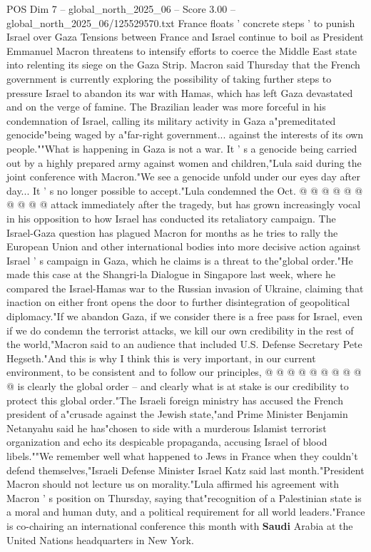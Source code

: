 \begin{textsample}{POS Dim 7 – global\_north\_2025\_06 – Score 3.00 – global\_north\_2025\_06/125529570.txt}  \label{ex:f7_pos_370}
France floats ' concrete steps ' to punish Israel over Gaza Tensions between France and Israel continue to boil as President Emmanuel Macron threatens to intensify efforts to coerce the Middle East state into relenting its siege on the Gaza Strip.
Macron said Thursday that the French government is currently exploring the possibility of taking further steps to pressure Israel to abandon its war with Hamas, which has left Gaza devastated and on the verge of famine.
The Brazilian leader was more forceful in his condemnation of Israel, calling its military activity in Gaza a"premeditated genocide"being waged by a"far-right government... against the interests of its own people.""What is happening in Gaza is not a war.
It ' s a genocide being carried out by a highly prepared army against women and children,"Lula said during the joint conference with Macron."We see a genocide unfold under our eyes day after day...
It ' s no longer possible to accept."Lula condemned the Oct. @ @ @ @ @ @ @ @ @ @ attack immediately after the tragedy, but has grown increasingly vocal in his opposition to how Israel has conducted its retaliatory campaign.
The Israel-Gaza question has plagued Macron for months as he tries to rally the European Union and other international bodies into more decisive action against Israel ' s campaign in Gaza, which he claims is a threat to the"global order."He made this case at the Shangri-la Dialogue in Singapore last week, where he compared the Israel-Hamas war to the Russian invasion of Ukraine, claiming that inaction on either front opens the door to further disintegration of geopolitical diplomacy."If we abandon Gaza, if we consider there is a free pass for Israel, even if we do condemn the terrorist attacks, we kill our own credibility in the rest of the world,"Macron said to an audience that included U.S.
Defense Secretary Pete Hegseth."And this is why I think this is very important, in our current environment, to be consistent and to follow our principles, @ @ @ @ @ @ @ @ @ @ is clearly the global order -- and clearly what is at stake is our credibility to protect this global order."The Israeli foreign ministry has accused the French president of a"crusade against the Jewish state,"and Prime Minister Benjamin Netanyahu said he has"chosen to side with a murderous Islamist terrorist organization and echo its despicable propaganda, accusing Israel of blood libels.""We remember well what happened to Jews in France when they couldn't defend themselves,"Israeli Defense Minister Israel Katz said last month."President Macron should not lecture us on morality."Lula affirmed his agreement with Macron ' s position on Thursday, saying that"recognition of a Palestinian state is a moral and human duty, and a political requirement for all world leaders."France is co-chairing an international conference this month with \textbf{Saudi} Arabia at the United Nations headquarters in New York.

\end{textsample}
